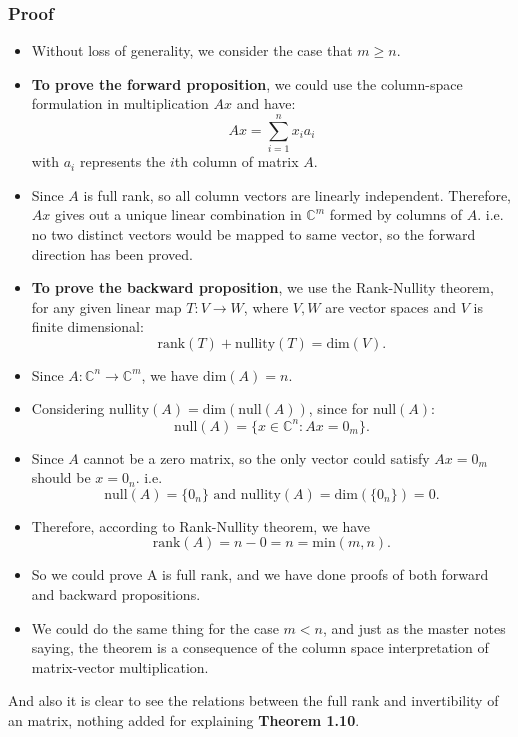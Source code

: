 \subsubsection*{Proof}
\begin{itemize}
  \item Without loss of generality, we consider the case that $m \ge  n$.
  \item \textbf{To prove the forward proposition}, we could use the column-space formulation in multiplication $Ax$ and have:
     \[
    Ax = \sum_{i=1}^{n} x_i a_i
    \]
    with $a_i$ represents the  $i$th column of matrix $A$.
  \item Since $A$ is full rank, so all column vectors are linearly independent. Therefore, $Ax$ gives out a unique linear combination in  $\mathbb{C}^{m}$ formed by columns of $A$. i.e. no two distinct vectors would be mapped to same vector, so the forward direction has been proved.
  \item \textbf{To prove the backward proposition}, we use the Rank-Nullity theorem, for any given linear map $T: V \to  W$, where $V, W$ are vector spaces and  $V$ is finite dimensional:
    \[
      \text{rank}(T) + \text{nullity}(T) = \text{dim}(V)
    .\]
  \item Since $A : \mathbb{C}^{n} \to  \mathbb{C}^{m}$, we have $\text{dim}(A) = n$.
  \item Considering $\text{nullity}(A) = \text{dim}(\text{null}(A))$, since for null$(A)$:
    \[
      \text{null}(A) = \{x \in \mathbb{C}^{n}: Ax = 0_m\} 
    .\]
  \item Since $A$ cannot be a zero matrix, so the only vector could satisfy $Ax = 0_m$ should be  $x = 0_n$. i.e. 
    \[
      \text{null}(A) = \{0_n\} \text{ and nullity}(A) = \text{dim}(\{0_n\}) = 0
    .\]
  \item Therefore, according to Rank-Nullity theorem, we have 
    \[
      \text{rank}(A) = n - 0 = n = \text{min}(m, n)
    .\]
  \item So we could prove A is full rank, and we have done proofs of both forward and backward propositions.
  \item We could do the same thing for the case $m < n$, and just as the master notes saying, the theorem is a consequence of the column space interpretation of matrix-vector multiplication.

\end{itemize}
And also it is clear to see the relations between the full rank and invertibility of an matrix, nothing added for explaining \textbf{Theorem 1.10}.
